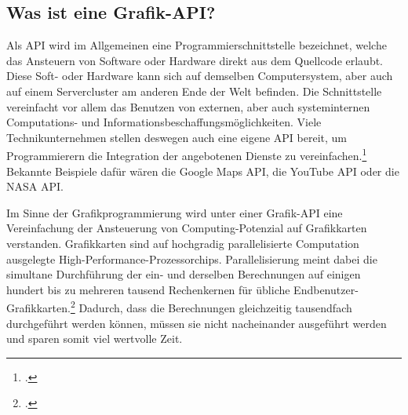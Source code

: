 \documentclass[titlepage, 11pt, a4paper, ngerman]{article}
\begin{document}
\subsection{Was ist eine Grafik-API?}
Als \acrfull{API} wird im Allgemeinen eine Programmierschnittstelle bezeichnet, welche das Ansteuern von Software oder Hardware direkt aus dem Quellcode erlaubt. Diese Soft- oder Hardware kann sich auf demselben Computersystem, aber auch auf einem Servercluster am anderen Ende der Welt befinden. Die Schnittstelle vereinfacht vor allem das Benutzen von externen, aber auch systeminternen Computations- und Informationsbeschaffungsmöglichkeiten. Viele Technikunternehmen stellen deswegen auch eine eigene \acrshort{API} bereit, um Programmierern die Integration der angebotenen Dienste zu vereinfachen.\footcite{apis} Bekannte Beispiele dafür wären die Google Maps \acrshort{API}, die YouTube \acrshort{API} oder die NASA \acrshort{API}.\par
Im Sinne der Grafikprogrammierung wird unter einer Grafik-\acrshort{API} eine Vereinfachung der Ansteuerung von Computing-Potenzial auf Grafikkarten verstanden. Grafikkarten sind auf hochgradig parallelisierte Computation ausgelegte High-Performance-Prozessorchips. Parallelisierung meint dabei die simultane Durchführung der ein- und derselben Berechnungen auf einigen hundert bis zu mehreren tausend Rechenkernen für übliche Endbenutzer-Grafikkarten.\footcite{cuda-cores} Dadurch, dass die Berechnungen gleichzeitig tausendfach durchgeführt werden können, müssen sie nicht nacheinander ausgeführt werden und sparen somit viel wertvolle Zeit.
\end{document}
